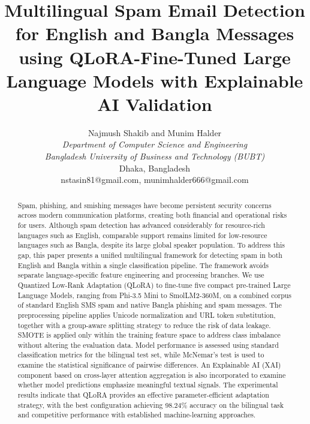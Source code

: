 \documentclass[journal]{IEEEtran}
\begin{document}
\title{Multilingual Spam Email Detection for English and Bangla Messages using QLoRA-Fine-Tuned Large Language Models with Explainable AI Validation}

\author{Najmush Shakib and Munim Halder \\
\textit{Department of Computer Science and Engineering} \\
\textit{Bangladesh University of Business and Technology (BUBT)} \\
Dhaka, Bangladesh \\
nstasin81@gmail.com, munimhalder666@gmail.com
}

\maketitle

\begin{abstract}
Spam, phishing, and smishing messages have become persistent security concerns across modern communication platforms, creating both financial and operational risks for users. Although spam detection has advanced considerably for resource-rich languages such as English, comparable support remains limited for low-resource languages such as Bangla, despite its large global speaker population. To address this gap, this paper presents a unified multilingual framework for detecting spam in both English and Bangla within a single classification pipeline. The framework avoids separate language-specific feature engineering and processing branches. We use Quantized Low-Rank Adaptation (QLoRA) to fine-tune five compact pre-trained Large Language Models, ranging from Phi-3.5 Mini to SmolLM2-360M, on a combined corpus of standard English SMS spam and native Bangla phishing and spam messages. The preprocessing pipeline applies Unicode normalization and URL token substitution, together with a group-aware splitting strategy to reduce the risk of data leakage. SMOTE is applied only within the training feature space to address class imbalance without altering the evaluation data. Model performance is assessed using standard classification metrics for the bilingual test set, while McNemar's test is used to examine the statistical significance of pairwise differences. An Explainable AI (XAI) component based on cross-layer attention aggregation is also incorporated to examine whether model predictions emphasize meaningful textual signals. The experimental results indicate that QLoRA provides an effective parameter-efficient adaptation strategy, with the best configuration achieving 98.24\% accuracy on the bilingual task and competitive performance with established machine-learning approaches.
\end{abstract}
\end{document}
